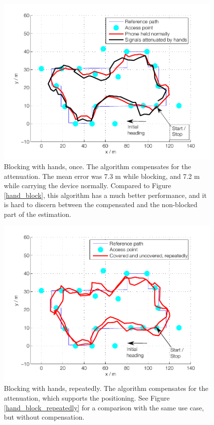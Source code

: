 \documentclass{LTHthesis}
\begin{document}
\begin{figure}[!htb]

\includegraphics[width=1\textwidth ]{images/adapt_parameters/hand_block_comp}
\caption{Blocking with hands, once. The algorithm compensates for the attenuation. The mean error was 7.3 m while blocking, and 7.2 m while carrying the device normally. Compared to Figure \ref{hand_block}, this algorithm has a much better performance, and it is hard to discern between the compensated and the non-blocked part of the estimation.}\label{hand_block_comp}
\end{figure}

\begin{figure}[!htb]

\includegraphics[width=1\textwidth ]{images/adapt_parameters/hand_block_repeatedly_comp}
\caption{Blocking with hands, repeatedly. The algorithm compensates for the attenuation, which supports the positioning. See Figure \ref{hand_block_repeatedly} for a comparison with the same use case, but without compensation. } \label{hand_block_repeatedly_comp}
\end{figure}
\end{document}
